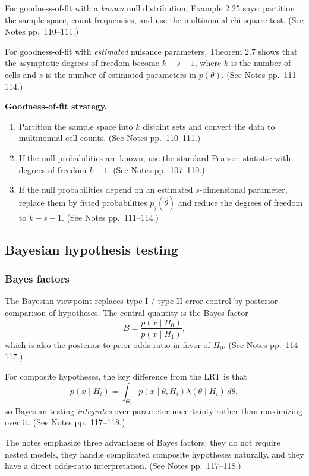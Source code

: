 For goodness-of-fit with a \emph{known} null distribution, Example 2.25 says: partition the sample space, count frequencies, and use the multinomial chi-square test. (See Notes pp.~110--111.)

For goodness-of-fit with \emph{estimated} nuisance parameters, Theorem 2.7 shows that the asymptotic degrees of freedom become $k-s-1$, where $k$ is the number of cells and $s$ is the number of estimated parameters in $p(\theta)$. (See Notes pp.~111--114.)

\begin{mybox}
\textbf{Goodness-of-fit strategy.}
\begin{enumerate}
    \item Partition the sample space into $k$ disjoint sets and convert the data to multinomial cell counts. (See Notes pp.~110--111.)
    \item If the null probabilities are known, use the standard Pearson statistic with degrees of freedom $k-1$. (See Notes pp.~107--110.)
    \item If the null probabilities depend on an estimated $s$-dimensional parameter, replace them by fitted probabilities $p_j(\hat\theta)$ and reduce the degrees of freedom to $k-s-1$. (See Notes pp.~111--114.)
\end{enumerate}
\end{mybox}

\subsection{Bayesian hypothesis testing}
\subsubsection{Bayes factors}
The Bayesian viewpoint replaces type I / type II error control by posterior comparison of hypotheses. The central quantity is the Bayes factor
\[
B=\frac{p(x \mid H_0)}{p(x \mid H_1)},
\]
which is also the posterior-to-prior odds ratio in favor of $H_0$. (See Notes pp.~114--117.)

For composite hypotheses, the key difference from the LRT is that
\[
p(x \mid H_i)=\int_{\Theta_i} p(x \mid \theta, H_i)\lambda(\theta \mid H_i)\, d\theta,
\]
so Bayesian testing \emph{integrates} over parameter uncertainty rather than maximizing over it. (See Notes pp.~117--118.)

The notes emphasize three advantages of Bayes factors: they do not require nested models, they handle complicated composite hypotheses naturally, and they have a direct odds-ratio interpretation. (See Notes pp.~117--118.)

